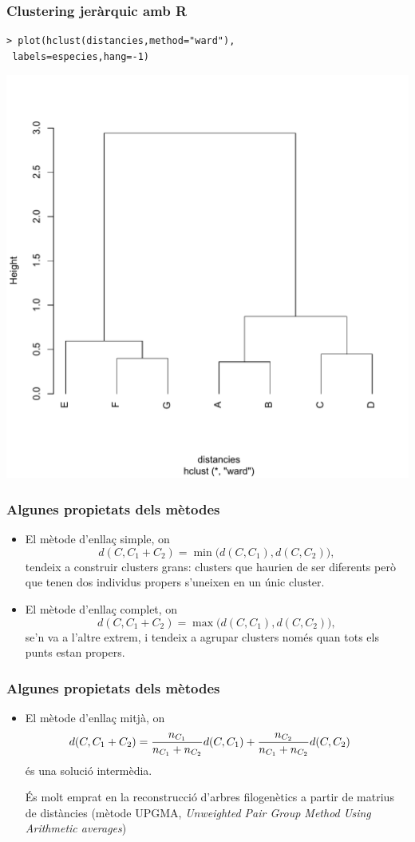 \documentclass[12pt,t]{beamer}
\renewcommand{\emph}[1]{{\color{red}#1}}
\theoremstyle{plain}
\theoremstyle{definition}
\begin{document}
\begin{frame}[fragile]
\frametitle{Clustering jeràrquic amb R}

\begin{verbatim}
> plot(hclust(distancies,method="ward"),
 labels=especies,hang=-1)
\end{verbatim}
\begin{center}
\includegraphics[width=0.7\linewidth]{Rplotw.pdf}
\end{center}
\end{frame}




\begin{frame}
\frametitle{Algunes propietats dels mètodes}
\begin{itemize}
\item El mètode d'enllaç simple, on
$$
d(C,C_1+C_2)=\min \big(d(C,C_1),d(C,C_2)\big),
$$
tendeix a construir clusters grans: clusters que haurien de ser diferents però que tenen dos individus propers s'uneixen en un únic cluster.
\medskip

\item El mètode d'enllaç complet, on
$$
d(C,C_1+C_2)=\max \big(d(C,C_1),d(C,C_2)\big),
$$
se'n va a l'altre extrem, i tendeix a agrupar  clusters només quan tots els punts estan propers.
\end{itemize}
\end{frame}


\begin{frame}
\frametitle{Algunes propietats dels mètodes}
\begin{itemize}
\item El mètode d'enllaç mitjà,
on 
$$
\hspace*{-3ex}d(C,C_1+C_2)=\frac{n_{C_1}}{n_{C_1}+ n_{C_2}} d(C,C_1)+\frac{n_{C_2}}{n_{C_1} + n_{C_2}} d(C,C_2)
$$
és una solució intermèdia.
\medskip

És molt emprat en la reconstrucció d'arbres filogenètics a partir de matrius de distàncies (mètode \emph{UPGMA}, \textsl{Unweighted Pair Group Method Using Arithmetic
averages})

\end{itemize}
\end{frame}
\end{document}
